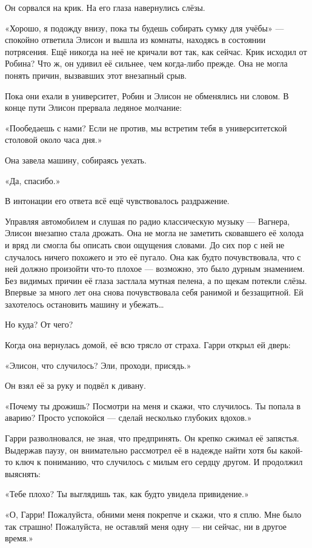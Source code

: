 \documentclass[a5paper, 9pt,
final, openany, twoside=true]{memoir}
\begin{document}
Он сорвался на крик. На его глаза навернулись слёзы.\bigskip

«Хорошо, я подожду внизу, пока ты будешь собирать сумку для учёбы» — спокойно ответила Элисон и вышла из комнаты, находясь в состоянии потрясения. Ещё никогда на неё не кричали вот так, как сейчас. Крик исходил от Робина? Что ж, он удивил её сильнее, чем когда-либо прежде. Она не могла понять причин, вызвавших этот внезапный срыв.\bigskip

Пока они ехали в университет, Робин и Элисон не обменялись ни словом. В конце пути Элисон прервала ледяное молчание:

«Пообедаешь с нами? Если не против, мы встретим тебя в университетской столовой около часа дня.»

Она завела машину, собираясь уехать.

«Да, спасибо.»

В интонации его ответа всё ещё чувствовалось раздражение.\bigskip

Управляя автомобилем и слушая по радио классическую музыку — Вагнера, Элисон внезапно стала дрожать. Она не могла не заметить сковавшего её холода и вряд ли смогла бы описать свои ощущения словами. До сих пор с ней не случалось ничего похожего и это её пугало. Она как будто почувствовала, что с ней должно произойти что-то плохое — возможно, это было дурным знамением. Без видимых причин её глаза застлала мутная пелена, а по щекам потекли слёзы. Впервые за много лет она снова почувствовала себя ранимой и беззащитной. Ей захотелось остановить машину и убежать…

Но куда? От чего?\bigskip

Когда она вернулась домой, её всю трясло от страха. Гарри открыл ей дверь:

«Элисон, что случилось? Эли, проходи, присядь.»

Он взял её за руку и подвёл к дивану.

«Почему ты дрожишь? Посмотри на меня и скажи, что случилось. Ты попала в аварию? Просто успокойся — сделай несколько глубоких вдохов.»

Гарри разволновался, не зная, что предпринять. Он крепко сжимал её запястья. Выдержав паузу, он внимательно рассмотрел её в надежде найти хотя бы какой-то ключ к пониманию, что случилось с милым его сердцу другом. И продолжил выяснять:

«Тебе плохо? Ты выглядишь так, как будто увидела привидение.»

«О, Гарри! Пожалуйста, обними меня покрепче и скажи, что я сплю. Мне было так страшно! Пожалуйста, не оставляй меня одну — ни сейчас, ни в другое время.»
\end{document}
